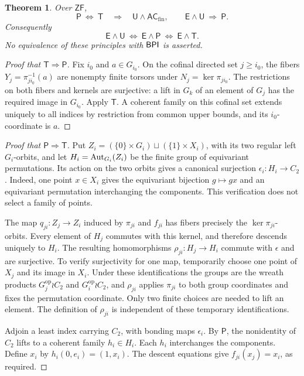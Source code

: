 \documentclass[11pt,a4paper]{article}
\newtheorem{theorem}{Theorem}[section]
\theoremstyle{definition}\newtheorem{definition}[theorem]{Definition}
\theoremstyle{remark}\newtheorem{remark}[theorem]{Remark}
\newcommand{\ZF}{\mathsf{ZF}}\newcommand{\ZFA}{\mathsf{ZFA}}
\newcommand{\E}{\mathsf E}\newcommand{\U}{\mathsf U}
\newcommand{\ACfin}{\mathsf{AC}_{\mathrm{fin}}}
\begin{document}
\begin{theorem}\label{thm:torsors}
Over $\ZF$,
\[
\mathsf P\ \Longleftrightarrow\ \mathsf T
\quad\Longrightarrow\quad \U\wedge\ACfin,
\qquad
\E\wedge\U\ \Longrightarrow\ \mathsf P.
\]
Consequently
\[
\E\wedge\U\ \Longleftrightarrow\ \E\wedge\mathsf P
\ \Longleftrightarrow\ \E\wedge\mathsf T.
\]
No equivalence of these principles with $\mathsf{BPI}$ is asserted.
\end{theorem}
\begin{proof}[Proof that $\mathsf T\Rightarrow\mathsf P$]
Fix $i_0$ and $a\in G_{i_0}$. On the cofinal directed set $j\geq i_0$, the fibers $Y_j=\pi_{j i_0}^{-1}(a)$ are nonempty finite torsors under $N_j=\ker\pi_{j i_0}$. The restrictions on both fibers and kernels are surjective: a lift in $G_k$ of an element of $G_j$ has the required image in $G_{i_0}$. Apply $\mathsf T$. A coherent family on this cofinal set extends uniquely to all indices by restriction from common upper bounds, and its $i_0$-coordinate is $a$.
\end{proof}
\begin{proof}[Proof that $\mathsf P\Rightarrow\mathsf T$]
Put $Z_i=(\{0\}\times G_i)\sqcup(\{1\}\times X_i)$, with its two regular left $G_i$-orbits, and let $H_i=\operatorname{Aut}_{G_i}(Z_i)$ be the finite group of equivariant permutations. Its action on the two orbits gives a canonical surjection $\epsilon_i:H_i\to C_2$. Indeed, one point $x\in X_i$ gives the equivariant bijection $g\mapsto gx$ and an equivariant permutation interchanging the components. This verification does not select a family of points.

The map $q_{ji}:Z_j\to Z_i$ induced by $\pi_{ji}$ and $f_{ji}$ has fibers precisely the $\ker\pi_{ji}$-orbits. Every element of $H_j$ commutes with this kernel, and therefore descends uniquely to $H_i$. The resulting homomorphisms $\rho_{ji}:H_j\to H_i$ commute with $\epsilon$ and are surjective. To verify surjectivity for one map, temporarily choose one point of $X_j$ and its image in $X_i$. Under these identifications the groups are the wreath products $G_j^{\mathrm{op}}\wr C_2$ and $G_i^{\mathrm{op}}\wr C_2$, and $\rho_{ji}$ applies $\pi_{ji}$ to both group coordinates and fixes the permutation coordinate. Only two finite choices are needed to lift an element. The definition of $\rho_{ji}$ is independent of these temporary identifications.

Adjoin a least index carrying $C_2$, with bonding maps $\epsilon_i$. By $\mathsf P$, the nonidentity of $C_2$ lifts to a coherent family $h_i\in H_i$. Each $h_i$ interchanges the components. Define $x_i$ by $h_i(0,e_i)=(1,x_i)$. The descent equations give $f_{ji}(x_j)=x_i$, as required.
\end{proof}
\end{document}
